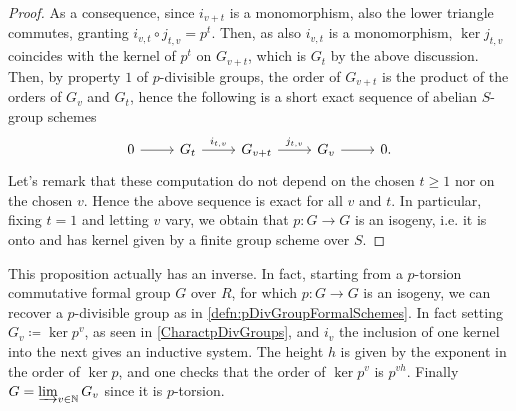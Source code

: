 \begin{proof}
	As a consequence, since $i_{v+t}$ is a monomorphism,
	also the lower triangle commutes, granting
	$i_{v,t} \circ j_{t,v} = p^t$.
	Then, as also $i_{v,t}$ is a monomorphism, $\ker j_{t,v}$
	coincides with the kernel of $p^t$ on $G_{v+t}$, 
	which is $G_t$ by the above discussion.
	Then, by property $1$ of $p$-divisible groups,
	the order of $G_{v+t}$ is the product of the orders
	of $G_v$ and $G_t$, hence the following is a
	short exact sequence of abelian $S$-group schemes
	\begin{equation}\label{eqn:pDivGrInducedmultiplication}
	\begin{tikzcd}
		0 \arrow[r, "", rightarrow] &
		G_t \arrow[r, "i_{t,v}", rightarrow] &
		G_{v+t} \arrow[r, "j_{t,v}", rightarrow] &
		G_v \arrow[r, "", rightarrow] &
		0
	.\end{tikzcd}
	\end{equation}
	Let's remark that these computation do not depend on the chosen $t \geq 1$
	nor on the chosen $v$.
	Hence the above sequence is exact for all $v$ and $t$.
	In particular, fixing $t=1$ and letting $v$ vary,
	we obtain that $p\colon G \to G$ is an isogeny,
	i.e. it is onto and has kernel given by a finite group scheme over $S$.
\end{proof}


\begin{rem}[]
	This proposition actually has an inverse.
	In fact, starting from a $p$-torsion commutative formal group $G$ over
	$R$, for which $p\colon G \to G$ is an isogeny, we can recover a $p$-divisible
	group as in \cref{defn:pDivGroupFormalSchemes}.
	In fact setting $G_v \coloneqq \ker p^v$, as seen in \cref{CharactpDivGroups},
	and $i_v$ the inclusion of one kernel into the next gives an inductive system.
	The height $h$ is given by the exponent in the order of $\ker p$,
	and one checks that the order of $\ker p^v$ is $p^{vh}$.
	Finally $G = \varinjlim_{v \in \mathbb{N}} G_v$ since it is $p$-torsion.
\end{rem}


